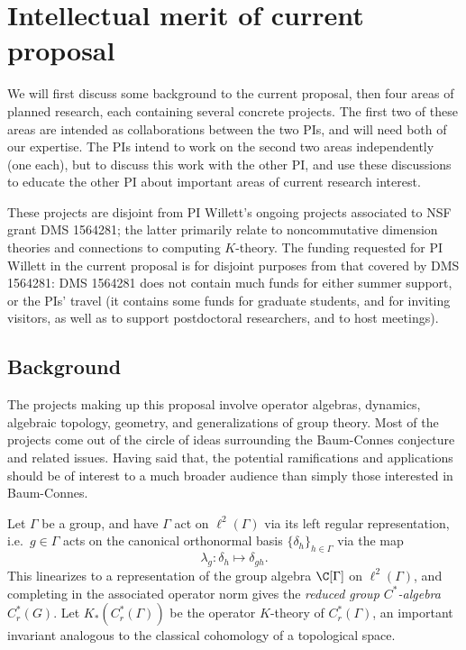 
\section{Intellectual merit of current proposal}\label{imc}

We will first discuss some background to the current proposal, then four areas of planned research, each containing several concrete projects.  The first two of these areas are intended as collaborations between the two PIs, and will need both of our expertise.  The PIs intend to work on the second two areas independently (one each), but to discuss this work with the other PI, and use these discussions to educate the other PI about important areas of current research interest.  

These projects are disjoint from PI Willett's ongoing projects associated to NSF grant DMS 1564281; the latter primarily relate to noncommutative dimension theories and connections to computing $K$-theory.  The funding requested for PI Willett in the current proposal is for disjoint purposes from that covered by DMS 1564281: DMS 1564281 does not contain much funds for either summer support, or the PIs' travel (it contains some funds for graduate students, and for inviting visitors, as well as to support postdoctoral researchers, and to host meetings).

\subsection*{Background}

The projects making up this proposal involve operator algebras, dynamics, algebraic topology, geometry, and generalizations of group theory.  Most of the projects come out of the circle of ideas surrounding the Baum-Connes conjecture and related issues.  Having said that, the potential ramifications and applications should be of interest to a much broader audience than simply those interested in Baum-Connes.

Let $\Gamma$ be a group, and have $\Gamma$ act on $\ell^2(\Gamma)$ via its left regular representation, i.e.\ $g\in \Gamma$ acts on the canonical orthonormal basis $\{\delta_h\}_{h\in \Gamma}$ via the map 
$$
\lambda_g:\delta_h\mapsto \delta_{gh}.
$$
This linearizes to a representation of the group algebra $\C[\Gamma]$ on $\ell^2(\Gamma)$, and completing in the associated operator norm gives the \emph{reduced group $C^*$-algebra} $C^*_r(G)$.  Let $K_*(C^*_r(\Gamma))$ be the operator $K$-theory of $C^*_r(\Gamma)$, an important invariant analogous to the classical cohomology of a topological space.  

